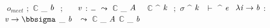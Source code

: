 {{\\
\ensuremath{}  \ensuremath{o_{meet}}  \ensuremath{;}  \ensuremath{\mathbb{C}} _{ \ensuremath{\Varid{b}} } \ensuremath{}  \ensuremath{;}  \ensuremath{}  \ensuremath{}  \ensuremath{}  \ensuremath{}  \ensuremath{\Varid{v}}  \ensuremath{\mathbin{:}}  \ensuremath{\anonymous }  \ensuremath{\leadsto }  \ensuremath{\mathbb{C}} _{ \ensuremath{\Conid{A}} } \ensuremath{}  \ensuremath{} 
}
{%
\ensuremath{}  \ensuremath{\mathbb{C}} ^{ \ensuremath{\Varid{k}} } \ensuremath{}  \ensuremath{;}  \ensuremath{\sigma } ^{ \ensuremath{\Varid{k}} } \ensuremath{}  \ensuremath{\vdash } ^{ \ensuremath{\Varid{e}} } \ensuremath{}  \ensuremath{\lambda \Varid{i}\to \Varid{b}}  \ensuremath{\mathbin{:}}  \ensuremath{\Varid{v}\to \mathbb{\bbsigma}} _{ \ensuremath{\Varid{b}} } \ensuremath{}  \ensuremath{\leadsto }  \ensuremath{\mathbb{C}} _{ \ensuremath{\Conid{A}} } \ensuremath{\mathbb{C}} _{ \ensuremath{\Varid{b}} } \ensuremath{}  \ensuremath{} 
}
}

